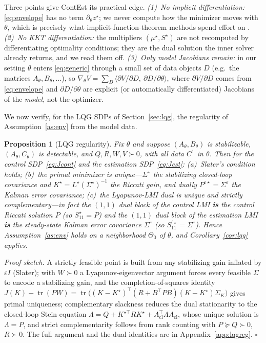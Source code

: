 \documentclass[twocolumn,amsthm]{autart}
\newtheorem{proposition}{Proposition}
\begin{document}
Three points give ContEst its practical edge. \emph{(1)~No implicit
differentiation:} \eqref{eq:envelope} has no term $\partial_\theta z^\star$; we
never compute how the minimizer moves with $\theta$, which is precisely what
implicit-function-theorem methods spend effort on
\cite{amos2017optnet,agrawal2019differentiable}. \emph{(2)~No KKT
differentiation:} the multipliers $(\mu^\star,S^\star)$ are not recomputed by
differentiating optimality conditions; they are the dual solution the inner
solver already returns, and we read them off. \emph{(3)~Only model Jacobians
remain:} in our setting $\theta$ enters \eqref{eq:generic} through a small set of
data objects $D$ (e.g.\ the matrices $A_\theta, B_\theta, \dots$), so
$\nabla_\theta V = \sum_D \langle \partial V / \partial D,\ \partial D /
\partial\theta\rangle$, where $\partial V/\partial D$ comes from
\eqref{eq:envelope} and $\partial D/\partial\theta$ are explicit (or
automatically differentiated) Jacobians of the \emph{model}, not the optimizer.

We now verify, for the LQG SDPs of Section~\ref{sec:lqg}, the regularity of
Assumption~\ref{as:env} from the model data.

\begin{proposition}[LQG regularity]\label{prop:lqgreg}
Fix $\theta$ and suppose $(A_\theta,B_\theta)$ is stabilizable, $(A_\theta,
C_\theta)$ is detectable, and $Q,R,W,V\succ0$, with all data $C^1$ in $\theta$.
Then for the control SDP~\eqref{eq:Jcont} and the estimation
SDP~\eqref{eq:Jest}: \emph{(a)}~Slater's condition holds; \emph{(b)}~the primal
minimizer is unique---$\Sigma^\star$ the stabilizing closed-loop covariance and
$K^\star=L^\star(\Sigma^\star)^{-1}$ the Riccati gain, and dually
$P^{\varepsilon\star}=\Sigma^\varepsilon$ the Kalman error covariance;
\emph{(c)}~the Lyapunov-LMI dual is unique and strictly complementary---in fact
the $(1,1)$ dual block of the control LMI \textbf{is} the control Riccati
solution $P$ (so $S_{11}^\star=P$) and the $(1,1)$ dual block of the estimation
LMI \textbf{is} the steady-state Kalman error covariance $\Sigma^\varepsilon$ (so
$S_{11}^{\prime\star}=\Sigma^\varepsilon$). Hence Assumption~\ref{as:env} holds
on a neighborhood $\Theta_0$ of $\theta$, and Corollary~\ref{cor:lqg} applies.
\end{proposition}

\emph{Proof sketch.} A strictly feasible point is built from any stabilizing gain
inflated by $\varepsilon I$ (Slater); with $W\succ0$ a Lyapunov-eigenvector
argument forces every feasible $\Sigma$ to encode a stabilizing gain, and the
completion-of-squares identity $J(K)-\operatorname{tr}(PW)=\operatorname{tr}\!\big(
(K-K^\star)^\top(R+B^\top PB)(K-K^\star)\Sigma_K\big)$ gives primal uniqueness;
complementary slackness reduces the dual stationarity to the closed-loop Stein
equation $\Lambda=Q+K^{\star\top}RK^\star+A_{\mathrm{cl}}^\top\Lambda
A_{\mathrm{cl}}$, whose unique solution is $\Lambda=P$, and strict
complementarity follows from rank counting with $P\succeq Q\succ0$, $R\succ0$.
The full argument and the dual identities are in Appendix~\ref{app:lqgreg}.
\hfill$\square$
\end{document}
